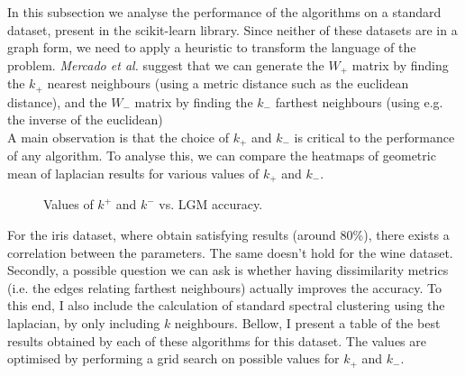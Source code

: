 \documentclass[11pt]{article}
\begin{document}
  In this subsection we analyse the performance of the algorithms on a standard 
  dataset, present in the scikit-learn library. 
  Since neither of these datasets are in a graph form, we need to apply a heuristic
  to transform the language of the problem. \emph{Mercado et al.} suggest that 
  we can generate the $W_+$ matrix by finding the $k_+$ nearest neighbours (using 
  a metric distance such as the euclidean distance), and the $W_-$ matrix by 
  finding the $k_-$ farthest neighbours (using e.g. the inverse of the euclidean) \\ 
    A main observation is that the choice of $k_+$ and $k_-$ is critical to the
  performance of any algorithm. To analyse this, we can compare the heatmaps 
  of geometric mean of laplacian results for various values of $k_+$ and $k_-$. 
  \begin{figure}[h!]
    \centering
      \hfill
      \caption{\label{fig:iriskheatmap} Values of $k^+$ and $k^-$ vs. LGM accuracy. }
  \end{figure}
  For the iris dataset, where obtain satisfying results (around 80\%), there 
  exists a correlation between the parameters. The same doesn't hold for the 
  wine dataset. \\ 
    Secondly, a possible question we can ask is whether having dissimilarity 
  metrics (i.e. the edges relating farthest neighbours) actually improves the 
  accuracy. To this end, I also include the calculation of standard spectral 
  clustering using the laplacian, by only including $k$ neighbours.
    Bellow, I present a table of the best results obtained by each of these 
  algorithms for this dataset. The values are optimised by performing a grid search
  on possible values for $k_+$ and $k_-$.
\end{document}
